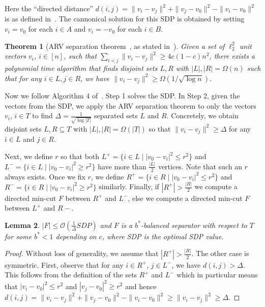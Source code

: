\documentclass[11pt]{article}
\newtheorem{theorem}{Theorem}[section]
\newtheorem{lemma}[theorem]{Lemma}
\newcommand{\OO}{\mathcal{O}}
\begin{document}
{\begin{center}
{      }
\end{center}
Here the ``directed distance'' $d(i,j) = \|v_i - v_j\|^2 +\|v_j - v_0\|^2 - \|v_i - v_0\|^2$ is as defined in~\cite{agarwal2005log}. The cannonical solution for this SDP is obtained by setting $v_i = v_0$ for each $i \in A$ and $v_i = -v_0$ for each $i \in B$.

\begin{theorem}[ARV separation theorem~\cite{arora2009expander}, as stated in~\cite{agarwal2005log}] Given a set of $\ell_2^2$ unit vectors $v_i$, $i \in [n]$, such that $\sum_{i < j} \|v_i -v_j\|^2 \geq 4c(1-c)n^2$, there exists a polynomial time algorithm that finds disjoint sets $L,R$ with $|L|, |R| = \Omega(n)$ such that for any $i \in L, j \in R$, we have $\|v_i - v_j\|^2 \geq \Omega({1}/{\sqrt{\log n}})$.
\label{thm:structure}


\end{theorem}



Now we follow Algorithm 4 of~\cite{agarwal2005log}. Step 1 solves the SDP. In Step 2, given the vectors from the SDP, we apply the ARV separation theorem to only the vectors $v_i$, $i \in T$ to find $\Delta = \frac{1}{\sqrt{\log |T|}}$ separated sets $L$ and $R$. Concretely, we obtain disjoint sets $L, R \subseteq T$ with $|L|, |R| = \Omega(|T|)$ so that $\|v_i - v_j\|^2 \geq \Delta$ for any $i \in L$ and $j \in R$.


Next, we define $r$ so that  both 
$L^+ = \{i \in L \mid |v_0 - v_i|^2 \leq r^2\}$ and $L^{-} = \{i \in L \mid |v_0 - v_i|^2 \geq r^2\}$ have more than $\frac{|L|}{2}$ vertices. Note that such an $r$ always exists. Once we fix $r$, we define $R^+ = \{i \in R \mid |v_0 - v_i|^2 \leq r^2\}$ and $R^{-} = \{i \in R \mid |v_0 - v_i|^2 \geq r^2\}$ similarly. Finally, if $|R^+| > \frac{|R|}{2}$ we compute a directed min-cut $F$ between $R^+$ and $L^-$, else we compute a directed min-cut $F$ between $L^+$ and $R-$. 

\begin{lemma}\label{lemma:approx}
$|F| \leq \OO(\frac{1}{\Delta} SDP)$ and $F$ is a $b^*$-balanced separator with respect to $T$ for some $b^* < 1$ depending on $c$, where SDP is the optimal SDP value.
\end{lemma}

\begin{proof}
Without loss of generality, we assume that $|R^+| > \frac{|R|}{2}$. The other case is symmetric. First, observe that for any $i \in R^+$, $j \in L^-$,  we have $d(i,j) > \Delta$. This follows from the definition of the sets $R^+$ and $L^-$ which in particular means that $|v_i - v_0|^2 \leq r^2$ and  $|v_j - v_0|^2 \geq r^2$ and hence $d(i,j) = \|v_i - v_j\|^2 +\|v_j - v_0\|^2 - \|v_i - v_0\|^2 \geq \|v_i - v_j\|^2 \geq \Delta$.


\end{proof}}
\end{document}

